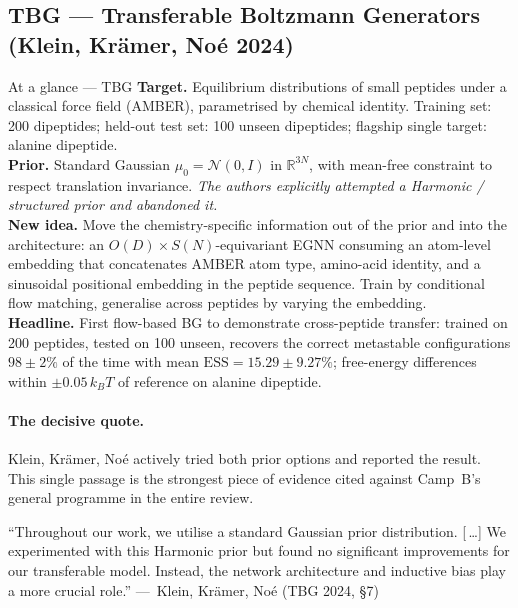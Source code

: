 \documentclass[11pt,letterpaper]{article}
\newcommand{\Real}{\mathbb{R}}
\newcommand{\ESS}{\mathrm{ESS}}
\theoremstyle{plain}
\begin{document}
\subsection{TBG --- Transferable Boltzmann Generators (Klein, Krämer, Noé 2024)}\label{sec:tbg}

\begin{methodbox}{At a glance --- TBG}
\textbf{Target.} Equilibrium distributions of small peptides under a classical
force field (AMBER), parametrised by chemical identity. Training set: 200
dipeptides; held-out test set: 100 unseen dipeptides; flagship single target:
alanine dipeptide.\\
\textbf{Prior.} Standard Gaussian $\mu_0=\mathcal N(0,I)$ in $\Real^{3N}$,
with mean-free constraint to respect translation invariance. \emph{The
authors explicitly attempted a Harmonic / structured prior and abandoned
it.}\\
\textbf{New idea.} Move the chemistry-specific information out of the prior
and into the architecture: an $O(D)\times S(N)$-equivariant EGNN consuming an
atom-level embedding that concatenates AMBER atom type, amino-acid identity,
and a sinusoidal positional embedding in the peptide sequence. Train by
conditional flow matching, generalise across peptides by varying the
embedding.\\
\textbf{Headline.} First flow-based BG to demonstrate cross-peptide transfer:
trained on 200 peptides, tested on 100 unseen, recovers the correct
metastable configurations $98\pm 2\%$ of the time with mean
$\ESS = 15.29\pm 9.27\%$; free-energy differences within $\pm 0.05\,k_BT$ of
reference on alanine dipeptide.
\end{methodbox}

\paragraph{The decisive quote.} Klein, Krämer, Noé actively tried both prior
options and reported the result. This single passage is the strongest piece
of evidence cited against Camp~B's general programme in the entire review.

\begin{killerquote}
``Throughout our work, we utilise a standard Gaussian prior distribution.
[\,\ldots] We experimented with this Harmonic prior but found no significant
improvements for our transferable model. Instead, the network architecture
and inductive bias play a more crucial role.''
\hfill ---~Klein, Krämer, Noé (TBG 2024, \S7)
\end{killerquote}
\end{document}

